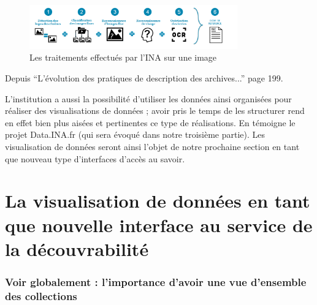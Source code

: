 \begin{figure}[h!]
	\centering
	\includegraphics[width=0.8\textwidth]{images/image11.png}
	\caption{Les traitements effectués par l'INA sur une image}
	\label{fig:image11}
\end{figure}


\begin{center}
	Depuis \enquote{L'évolution des pratiques de description des archives...} page 199. 
\end{center}

L’institution a aussi la possibilité d'utiliser les données ainsi organisées pour réaliser des visualisations de données ; avoir pris le temps de les structurer rend en effet bien plus aisées et pertinentes ce type de réalisations. En témoigne le projet Data.INA.fr (qui sera évoqué dans notre troisième partie). Les visualisation de données seront ainsi l’objet de notre prochaine section en tant que nouveau type d'interfaces d'accès au savoir.

\chapter{La visualisation de données en tant que nouvelle interface au service de la découvrabilité}

\subsection{Voir globalement : l'importance d'avoir une vue d'ensemble des collections}


